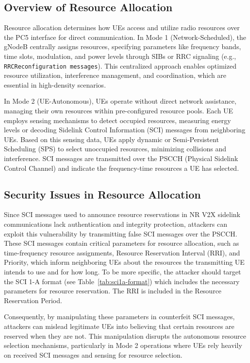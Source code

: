 \subsection{Overview of Resource Allocation}

Resource allocation determines how UEs access and utilize radio resources over the PC5 interface for direct communication. 
In Mode 1 (Network-Scheduled), the gNodeB centrally assigns resources, specifying parameters like frequency bands, time slots, modulation, and power levels through SIBs or RRC signaling (e.g., \texttt{RRCReconfiguration messages}). This centralized approach enables optimized resource utilization, interference management, and coordination, which are essential in high-density scenarios. 

In Mode 2 (UE-Autonomous), UEs operate without direct network assistance, managing their own resources within pre-configured resource pools. Each UE employs sensing mechanisms to detect occupied resources, measuring energy levels or decoding Sidelink Control Information (SCI) messages from neighboring UEs. Based on this sensing data, UEs apply dynamic or Semi-Persistent Scheduling (SPS) to select unoccupied resources, minimizing collisions and interference. SCI messages are transmitted over the PSCCH (Physical Sidelink Control Channel) and indicate the frequency-time resources a UE has selected.

\subsection{Security Issues in Resource Allocation}

Since SCI messages used to announce resource reservations in NR V2X sidelink communications lack authentication and integrity protection, attackers can exploit this vulnerability by transmitting false SCI messages over the PSCCH. These SCI messages contain critical parameters for resource allocation, such as time-frequency resource assignments, Resource Reservation Interval (RRI), and Priority, which inform neighboring UEs about the resources the transmitting UE intends to use and for how long. To be more specific, the attacker should target the SCI 1-A format (see Table~\ref{tab:sci1a-format}) which includes the necessary parameters for resource reservation. The RRI is included in the Resource Reservation Period.

Consequently, by manipulating these parameters in counterfeit SCI messages, attackers can mislead legitimate UEs into believing that certain resources are reserved when they are not. This manipulation disrupts the autonomous resource selection mechanisms, particularly in Mode 2 operations where UEs rely heavily on received SCI messages and sensing for resource selection.

